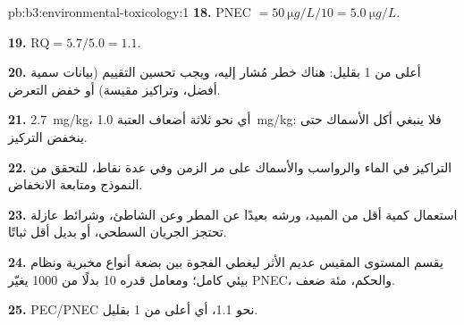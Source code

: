 \begin{solution}{pb:b3:environmental-toxicology:1}
\textbf{18.} PNEC $= \qty{50}{\micro g/L}/10 = \qty{5.0}{\micro g/L}$.

\textbf{19.} $\mathrm{RQ} = 5.7/5.0 = 1.1$.

\textbf{20.} أعلى من 1 بقليل: هناك خطر مُشار إليه، ويجب تحسين التقييم (بيانات
سمية أفضل، وتراكيز مقيسة) أو خفض التعرض.

\textbf{21.} \qty{2.7}{mg/kg}، أي نحو ثلاثة أضعاف العتبة \qty{1.0}{mg/kg}: فلا ينبغي أكل الأسماك
حتى ينخفض التركيز.

\textbf{22.} التراكيز في الماء والرواسب والأسماك على مر الزمن وفي عدة نقاط،
للتحقق من النموذج ومتابعة الانخفاض.

\textbf{23.} استعمال كمية أقل من المبيد، ورشه بعيدًا عن المطر وعن الشاطئ،
وشرائط عازلة تحتجز الجريان السطحي، أو بديل أقل ثباتًا.

\textbf{24.} يقسم المستوى المقيس عديم الأثر ليغطي الفجوة بين بضعة أنواع
مخبرية ونظام بيئي كامل؛ ومعامل قدره 10 بدلًا من 1000 يغيّر
PNEC، والحكم، مئة ضعف.

\textbf{25.}  PEC/PNEC نحو 1.1، أي أعلى من 1 بقليل.
\end{solution}
